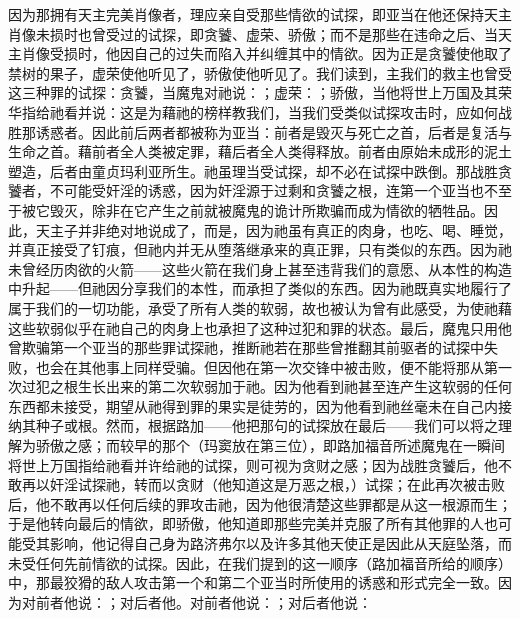 因为那拥有天主完美肖像者，理应亲自受那些情欲的试探，即亚当在他还保持天主肖像未损时也曾受过的试探，即贪饕、虚荣、骄傲；而不是那些在违命之后、当天主肖像受损时，他因自己的过失而陷入并纠缠其中的情欲。因为正是贪饕使他取了禁树的果子，虚荣使他听见了，骄傲使他听见了。我们读到，主我们的救主也曾受这三种罪的试探：贪饕，当魔鬼对祂说：；虚荣：；骄傲，当他将世上万国及其荣华指给祂看并说：这是为藉祂的榜样教我们，当我们受类似试探攻击时，应如何战胜那诱惑者。因此前后两者都被称为亚当：前者是毁灭与死亡之首，后者是复活与生命之首。藉前者全人类被定罪，藉后者全人类得释放。前者由原始未成形的泥土塑造，后者由童贞玛利亚所生。祂虽理当受试探，却不必在试探中跌倒。那战胜贪饕者，不可能受奸淫的诱惑，因为奸淫源于过剩和贪饕之根，连第一个亚当也不至于被它毁灭，除非在它产生之前就被魔鬼的诡计所欺骗而成为情欲的牺牲品。因此，天主子并非绝对地说成了，而是，因为祂虽有真正的肉身，也吃、喝、睡觉，并真正接受了钉痕，但祂内并无从堕落继承来的真正罪，只有类似的东西。因为祂未曾经历肉欲的火箭——这些火箭在我们身上甚至违背我们的意愿、从本性的构造中升起——但祂因分享我们的本性，而承担了类似的东西。因为祂既真实地履行了属于我们的一切功能，承受了所有人类的软弱，故也被认为曾有此感受，为使祂藉这些软弱似乎在祂自己的肉身上也承担了这种过犯和罪的状态。最后，魔鬼只用他曾欺骗第一个亚当的那些罪试探祂，推断祂若在那些曾推翻其前驱者的试探中失败，也会在其他事上同样受骗。但因他在第一次交锋中被击败，便不能将那从第一次过犯之根生长出来的第二次软弱加于祂。因为他看到祂甚至连产生这软弱的任何东西都未接受，期望从祂得到罪的果实是徒劳的，因为他看到祂丝毫未在自己内接纳其种子或根。然而，根据路加——他把那句的试探放在最后——我们可以将之理解为骄傲之感；而较早的那个（玛窦放在第三位），即路加福音所述魔鬼在一瞬间将世上万国指给祂看并许给祂的试探，则可视为贪财之感；因为战胜贪饕后，他不敢再以奸淫试探祂，转而以贪财（他知道这是万恶之根，）试探；在此再次被击败后，他不敢再以任何后续的罪攻击祂，因为他很清楚这些罪都是从这一根源而生；于是他转向最后的情欲，即骄傲，他知道即那些完美并克服了所有其他罪的人也可能受其影响，他记得自己身为路济弗尔以及许多其他天使正是因此从天庭坠落，而未受任何先前情欲的试探。因此，在我们提到的这一顺序（路加福音所给的顺序）中，那最狡猾的敌人攻击第一个和第二个亚当时所使用的诱惑和形式完全一致。因为对前者他说：；对后者他。对前者他说：；对后者他说：\par

